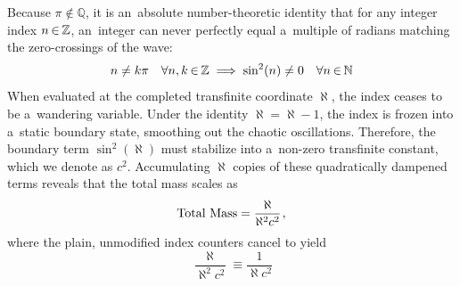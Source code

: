 \documentclass[11pt,a4paper]{article}
\newcommand\fex{\hspace{.2ex}} %
\newcommand\nfex{\hspace{-0.2ex}} %
\newcommand\cin{\nfex\in\nfex}
\theoremstyle{definition}
\theoremstyle{noperiod}
\begin{document}
Because $\pi \notin \mathbb{Q}$, it is an~absolute number-theoretic identity that for any integer index ${n \cin \mathbb{Z}}$, an~integer can never perfectly equal a~multiple of radians matching the zero-crossings of the wave:
\begin{equation}
n \neq k\pi \quad \forall n, k \cin \mathbb{Z} \implies \sin^2(n) \neq 0 \quad \forall n \cin \mathbb{N}
\end{equation}
When evaluated at the completed transfinite coordinate $\aleph$, the index ceases to be a~wandering variable. Under the identity $\aleph = \aleph - 1$, the index is frozen into a~static boundary state, smoothing out the chaotic oscillations. Therefore, the boundary term $\sin^2(\aleph)$ must stabilize into a~non-zero transfinite constant, which we denote as $c^2$.
Accumulating $\aleph$ copies of these quadratically dampened terms reveals that the total mass scales as
\begin{equation}
\text{Total Mass} = \frac{\aleph}{\aleph^2 c^2}
\fex ,
\end{equation}
where the plain, unmodified index counters cancel to yield
\begin{equation}
\frac{\aleph}{\aleph^2 c^2} \equiv \frac{1}{\aleph c^2}
\end{equation}
\end{document}
